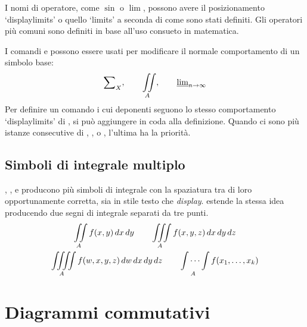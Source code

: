 \documentclass[a4paper,leqno,titlepage,openany]{amsldoc}[1999/12/13]
\begin{document}
I nomi di operatore, come $\sin$ o $\lim$, possono avere il posizionamento
`displaylimits' o quello `limits' a seconda di come sono stati definiti. Gli operatori
pi\`u comuni sono definiti in base all'uso consueto in matematica.

I comandi  e  possono essere usati per modificare
il normale comportamento di un simbolo base:
\begin{equation*}
\sum\nolimits_X,\qquad \iint\limits_{A},
\qquad\varliminf\nolimits_{n\to \infty}
\end{equation*}
Per definire un comando i cui deponenti seguono lo
stesso comportamento `displaylimits' di , si pu\`o aggiungere
 in coda alla definizione. Quando ci sono
pi\`u istanze consecutive di , , o ,
l'ultima ha la priorit\`a.

\section{Simboli di integrale multiplo}

, , e  producono pi\`u simboli di integrale
 con la spaziatura tra di loro opportunamente
corretta, sia in stile testo che \emph{display}.  estende
la stessa idea producendo due segni di integrale separati da tre punti.
\begin{gather}
\iint\limits_A f(x,y)\,dx\,dy\qquad\iiint\limits_A
f(x,y,z)\,dx\,dy\,dz\\
\iiiint\limits_A
f(w,x,y,z)\,dw\,dx\,dy\,dz\qquad\idotsint\limits_A f(x_1,\dots,x_k)
\end{gather}


\chapter{Diagrammi commutativi}\label{s:commdiag}
\end{document}
